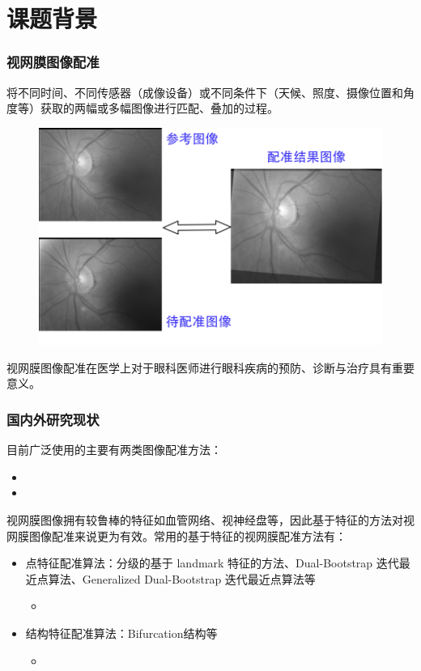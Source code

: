 \documentclass[notheorems,mathserif,table,compress]{beamer}  %
\begin{document}
\section{课题背景}


\begin{frame}
\frametitle{视网膜图像配准}
 将不同时间、不同传感器（成像设备）或不同条件下（天候、照度、摄像位置和角度等）获取的两幅或多幅图像进行匹配、叠加的过程。
 \begin{figure}[ht!]
    \centering
  \includegraphics[width=0.6\linewidth]{配准示例.png}
 \end{figure}
视网膜图像配准在医学上对于眼科医师进行眼科疾病的预防、诊断与治疗具有重要意义。
\end{frame}


\begin{frame}
\frametitle{国内外研究现状}
目前广泛使用的主要有两类图像配准方法：
\begin{itemize}
\item {\color{blue}{基于灰度信息的配准方法}} %
\item {\color{blue}{基于特征的配准方法}} %
\end{itemize}
视网膜图像拥有较鲁棒的特征如血管网络、视神经盘等，因此基于特征的方法对视网膜图像配准来说更为有效。常用的基于特征的视网膜配准方法有：
\begin{itemize}
\item 点特征配准算法：分级的基于 landmark 特征的方法、Dual-Bootstrap 迭代最近点算法、Generalized Dual-Bootstrap 迭代最近点算法等
\begin{itemize}
\item {\color{red}{依赖于单个分叉点或交叉点的分支角度，易造成错配}}
\end{itemize}
\item 结构特征配准算法：Bifurcation结构等 
\begin{itemize}
\item {\color{red}{准确性提高，但对分割结果要求较高，对血管细节较敏感}}
\end{itemize}
\end{itemize}

\end{frame}
\end{document}
